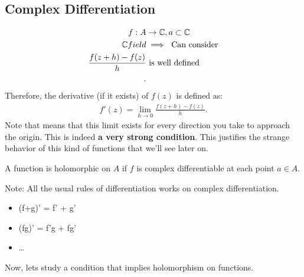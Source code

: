 \documentclass[english, a4paper,12pt]{Iart}
\theoremstyle{plain} %
\theoremstyle{remark}
\theoremstyle{definition}
\begin{document}
\subsection{Complex Differentiation}
\begin{align*}
    f: A &\to \mathbb{C}, a \subset \mathbb{C}\\
    \mathbb{C} field &\implies \text{ Can consider}\\
    \frac{f(z+h) - f(z)}{h} &\text{ is well defined}\\
.\end{align*}
Therefore, the derivative (if it exists) of $f(z)$ is defined as:
\begin{align*}
    f'(z) = \lim_{h\to 0} \frac{f(z+h)-f(z)}{h}
.\end{align*}
Note that means that this limit exists for every direction you take to approach the origin. This is indeed \textbf{a very strong condition}. This justifies the strange behavior of this kind of functions that we'll see later on.\\
\begin{defnition}
        A function is holomorphic on $A$ if $f$ is complex differentiable at each point $a \in A$.
\end{defnition}

\begin{tcolorbox}
    Note: All the usual rules of differentiation works on complex differentiation.\\
    \begin{itemize}
        \item (f+g)' = f' + g'\\
        \item (fg)' = f'g + fg'
        \item \ldots
    \end{itemize}
\end{tcolorbox}

Now, lets study a condition that implies holomorphism on functions.
\end{document}
